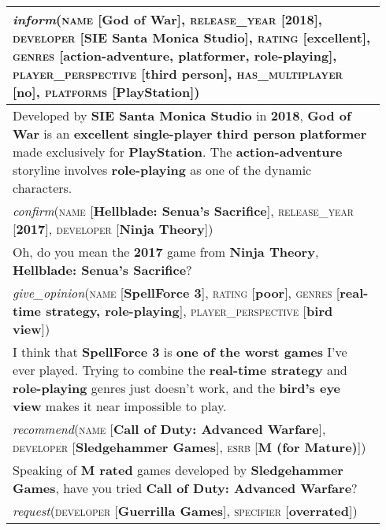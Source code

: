 \documentclass[11pt,a4paper]{article}
\begin{document}
\begin{table}
    \small
  	\centering
  	\def\arraystretch{1.5}
    \begin{tabular}{p{0.94\linewidth}}
    	\hline
    	\rowcolor{light-gray}
    	\emph{inform}(\textsc{name} [\textbf{God of War}], \textsc{release\_year} [\textbf{2018}], \textsc{developer} [\textbf{SIE Santa Monica Studio}], \textsc{rating} [\textbf{excellent}], \textsc{genres} [\textbf{action-adventure, platformer, role-playing}], \textsc{player\_perspective} [\textbf{third person}], \textsc{has\_multiplayer} [\textbf{no}], \textsc{platforms} [\textbf{PlayStation}]) \\
        \hline
    	Developed by \textbf{SIE Santa Monica Studio} in \textbf{2018}, \textbf{God of War} is an \textbf{excellent} \textbf{single-player} \textbf{third person} \textbf{platformer} made exclusively for \textbf{PlayStation}. The \textbf{action-adventure} storyline involves \textbf{role-playing} as one of the dynamic characters. \\
    	\hline
    	\rowcolor{light-gray}
    	\emph{confirm}(\textsc{name} [\textbf{Hellblade: Senua's Sacrifice}], \textsc{release\_year} [\textbf{2017}], \textsc{developer} [\textbf{Ninja Theory}]) \\
        \hline
    	Oh, do you mean the \textbf{2017} game from \textbf{Ninja Theory}, \textbf{Hellblade: Senua's Sacrifice}? \\
        \hline
    	\rowcolor{light-gray}
    	\emph{give\_opinion}(\textsc{name} [\textbf{SpellForce 3}], \textsc{rating} [\textbf{poor}], \textsc{genres} [\textbf{real-time strategy, role-playing}], \textsc{play\-er\_per\-spec\-tive} [\textbf{bird view}]) \\
        \hline
    	I think that \textbf{SpellForce 3} is \textbf{one of the worst games} I've ever played. Trying to combine the \textbf{real-time strategy} and \textbf{role-playing} genres just doesn't work, and the \textbf{bird's eye view} makes it near impossible to play. \\
        \hline
    	\rowcolor{light-gray}
    	\emph{recommend}(\textsc{name} [\textbf{Call of Duty: Advanced Warfare}], \textsc{developer} [\textbf{Sledgehammer Games}], \textsc{esrb} [\textbf{M (for Mature)}]) \\
        \hline
    	Speaking of \textbf{M rated} games developed by \textbf{Sledgehammer Games}, have you tried \textbf{Call of Duty: Advanced Warfare}? \\
        \hline
    	\rowcolor{light-gray}
    	\emph{request}(\textsc{developer} [\textbf{Guerrilla Games}], \textsc{specifier} [\textbf{overrated}]) \\

\end{tabular}
\end{table}
\end{document}
